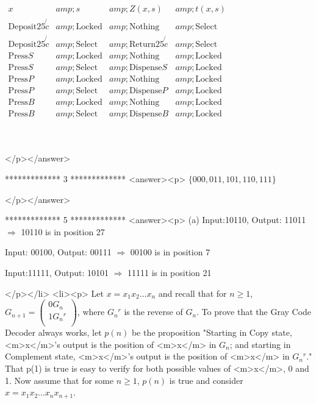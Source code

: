   \(\begin{array}{cccc}
 x &amp; s &amp; Z(x,s) &amp; t(x,s) \\
 \text{Deposit} 25\not{c} &amp; \text{Locked} &amp; \text{Nothing} &amp; \text{Select} \\
 \text{Deposit} 25\not{c} &amp; \text{Select} &amp; \text{Return} 25\not{c} &amp; \text{Select} \\
 \text{Press} S &amp; \text{Locked} &amp; \text{Nothing} &amp; \text{Locked} \\
 \text{Press} S &amp; \text{Select} &amp; \text{Dispense} S &amp; \text{Locked} \\
 \text{Press} P &amp; \text{Locked} &amp; \text{Nothing} &amp; \text{Locked} \\
 \text{Press} P &amp; \text{Select} &amp; \text{Dispense} P &amp; \text{Locked} \\
 \text{Press} B &amp; \text{Locked} &amp; \text{Nothing} &amp; \text{Locked} \\
 \text{Press} B &amp; \text{Select} &amp; \text{Dispense} B &amp; \text{Locked} \\
\end{array}\)

\begin{doublespace}
\noindent\(\)
\end{doublespace}

</p></answer>


*************
3
*************
<answer><p>  \(\{000,011, 101, 110, 111\}\)

</p></answer>


*************
5
*************
<answer><p> (a) Input:10110, Output: 11011 \(\Rightarrow\) 10110 is in position 27 



         Input: 00100, Output: 00111 \(\Rightarrow\) 00100 is in position 7 



         Input:11111, Output: 10101 \(\Rightarrow\) 11111 is in position 21

</p></li>
<li><p>  Let \(x=x_1x_2\ldots  x_n\) and recall that for \(n\geq 1\),  \(G_{n+1}=\left(
\begin{array}{c}
 0G_n \\
 1G_n{}^r \\
\end{array}
\right)\), where \(G_n{}^r\) is the reverse of \(G_n\). To prove that the Gray Code Decoder always works, let \(p(n)\) be the proposition $\texttt{"}$Starting
in Copy state,  <m>x</m>'s output is the position of <m>x</m> in \(G_n\);  and starting in Complement state, <m>x</m>'s output is the
position of <m>x</m> in \(G_n{}^r\).$\texttt{"}$ That p(1) is true is easy to verify for both possible values of <m>x</m>,  0 and 1.  Now
assume that for some \(n\geq 1\), \(p(n)\) is true and consider \(x=x_1x_2\ldots  x_nx_{n+1}\). 



